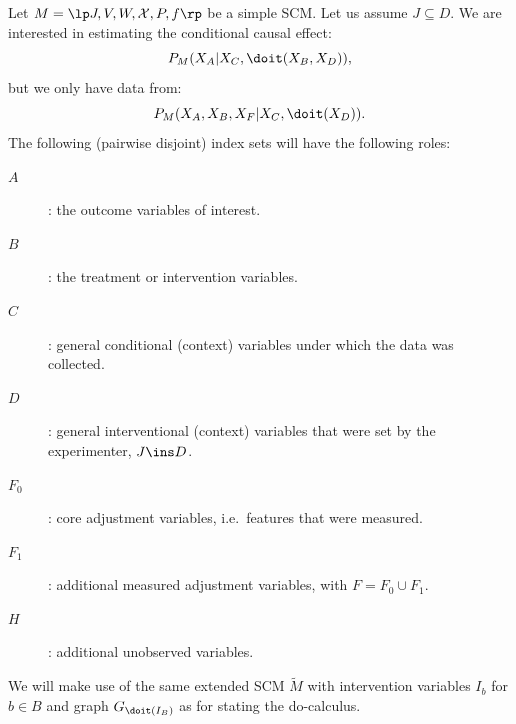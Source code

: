 Let $M = \lt \Sin, \Send, \Srnd, \CX, P, f \rt$ be a simple SCM.
Let us assume $J \subseteq D$.
We are interested in estimating the conditional causal effect:
\[ P_{M}(X_A|X_C,\doit(X_B,X_D)), \]
but we only have data from:
\[ P_{M}(X_A,X_B,X_F|X_C,\doit(X_D)). \]
The following (pairwise disjoint) index sets will have the following roles:
\begin{description}
  \item[$A$]: the outcome variables of interest.
  \item[$B$]: the treatment or intervention variables.
  \item[$C$]: general conditional (context) variables under which the data was collected.
  \item[$D$]: general interventional (context) variables that were set by the experimenter, $J \ins D$.
  \item[$F_0$]: core adjustment variables, i.e.\ features that were measured.
  \item[$F_1$]: additional measured adjustment variables, with $F = F_0 \cup F_1$.
  \item[$H$]: additional unobserved variables.
\end{description}
We will make use of the same extended SCM $\tilde{M}$ with intervention variables $I_b$ for $b \in B$ and graph
$G_{\doit(I_B)}$ as for stating the do-calculus. 

